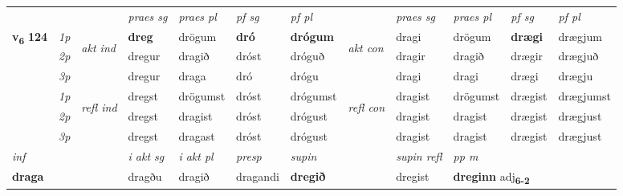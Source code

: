 \begin{longtable}[l]{X>{\footnotesize\itshape}llXXXXlXXXX}
 & &   & \textit{praes sg}  & \textit{praes pl}    & \textit{ pf sg} & \textit{pf pl} & & \textit{praes sg}  & \textit{praes pl}    & \textit{pf sg} & \textit{pf pl }  \\ \cmidrule{4-7} \cmidrule{9-12}
 \multirow{2}{*}{{{\textbf{v{\textsubscript{6}}} \Large{\textbf{124}}}}}  & 1p & \multirow{3}{*}{\begin{turn}{90}\textit{akt ind}\end{turn}} & \textbf{dreg} & drögum & \textbf{dró} & \textbf{drógum} & \multirow{3}{*}{\begin{turn}{90}\textit{akt con}\end{turn}} &dragi & drögum & \textbf{drægi} & drægjum\\*
 & 2p &  &  dregur  & dragið & dróst & dróguð & & dragir & dragið & drægir & drægjuð \\*
 & 3p &  & dregur & draga & dró & drógu & & dragi & dragi& drægi & drægju \\*
\cmidrule{4-7} \cmidrule{9-12}
 & 1p & \multirow{3}{*}{\begin{turn}{90}\textit{refl ind}\end{turn}}  & dregst & drögumst & dróst & drógumst & \multirow{3}{*}{\begin{turn}{90}\textit{refl con}\end{turn}}  &dragist & drögumst & drægist & drægjumst \\*
 & 2p &  & dregst & dragist & dróst & drógust & &dragist & dragist & drægist & drægjust \\*
 & 3p  & & dregst & dragast & dróst & drógust & & dragist & dragist& drægist & drægjust \\*
\cmidrule{4-7} \cmidrule{9-12}

   {\textit{inf}} & &  & \textit{i akt sg} & \textit{i akt pl}   & \textit{presp} & \textit{supin} && \textit{supin refl} & \textit{pp m} \\*
  {\textbf{draga}} & && dragðu  & dragið   & dragandi &  \textbf{dregið} && dregist & \multicolumn{2}{l}{\textbf{dreginn} adj\textbf{\textsubscript{6-2}}} \\*

\midrule


\end{longtable}
